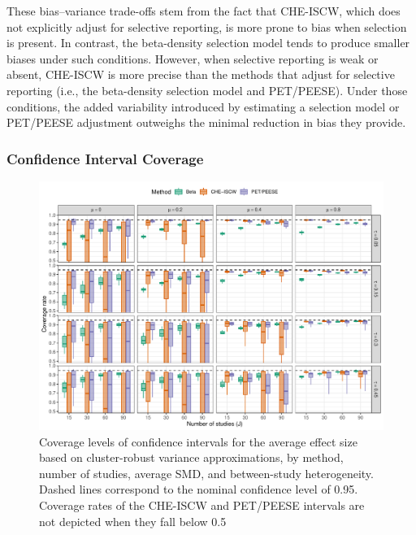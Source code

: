 \documentclass[
  american,
  man, donotrepeattitle,floatsintext]{apa7}
\begin{document}
These bias--variance trade-offs stem from the fact that CHE-ISCW, which does not explicitly adjust for selective reporting, is more prone to bias when selection is present. In contrast, the beta-density selection model tends to produce smaller biases under such conditions. However, when selective reporting is weak or absent, CHE-ISCW is more precise than the methods that adjust for selective reporting (i.e., the beta-density selection model and PET/PEESE). Under those conditions, the added variability introduced by estimating a selection model or PET/PEESE adjustment outweighs the minimal reduction in bias they provide.

\subsubsection{Confidence Interval Coverage}\label{confidence-interval-coverage}

\begin{figure}
\includegraphics{beta-function-selection-models-with-dependent-effects_files/figure-latex/comparison-coverage-main-1} \caption{Coverage levels of confidence intervals for the average effect size based on cluster-robust variance approximations, by method, number of studies, average SMD, and between-study heterogeneity. Dashed lines correspond to the nominal confidence level of 0.95. Coverage rates of the CHE-ISCW and PET/PEESE intervals are not depicted when they fall below 0.5}\label{fig:comparison-coverage-main}
\end{figure}
\end{document}
